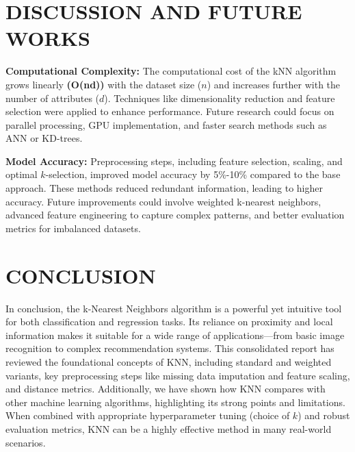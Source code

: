 \documentclass[10pt,twocolumn]{article}
\begin{document}
\section{DISCUSSION AND FUTURE WORKS}
\textbf{Computational Complexity:} The computational cost of the kNN algorithm grows linearly \textbf{(O(nd))} with the dataset size (\(n\)) and increases further with the number of attributes (\(d\)). Techniques like dimensionality reduction and feature selection were applied to enhance performance. Future research could focus on parallel processing, GPU implementation, and faster search methods such as ANN or KD-trees.

\textbf{Model Accuracy:} Preprocessing steps, including feature selection, scaling, and optimal \(k\)-selection, improved model accuracy by 5\%-10\% compared to the base approach. These methods reduced redundant information, leading to higher accuracy. Future improvements could involve weighted k-nearest neighbors, advanced feature engineering to capture complex patterns, and better evaluation metrics for imbalanced datasets.

\section{CONCLUSION}
In conclusion, the k-Nearest Neighbors algorithm is a powerful yet intuitive tool for both classification and regression tasks. Its reliance on proximity and local information makes it suitable for a wide range of applications—from basic image recognition to complex recommendation systems. This consolidated report has reviewed the foundational concepts of KNN, including standard and weighted variants, key preprocessing steps like missing data imputation and feature scaling, and distance metrics. Additionally, we have shown how KNN compares with other machine learning algorithms, highlighting its strong points and limitations. When combined with appropriate hyperparameter tuning (choice of $k$) and robust evaluation metrics, KNN can be a highly effective method in many real-world scenarios.
\end{document}
